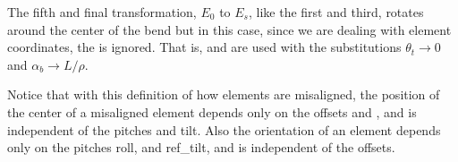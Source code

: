The fifth and final transformation, $E_0$ to $E_s$, like the first and third, rotates around the
center of the bend but in this case, since we are dealing with element coordinates, the
 is ignored.  That is,  and  are used with the substitutions
$\theta_t \rightarrow 0$ and $\alpha_b \rightarrow L/\rho$.

Notice that with this definition of how elements are misaligned, the position of the center of a
misaligned element depends only on the offsets and , and is independent of the pitches and
tilt. Also the orientation of an element depends only on the pitches roll, and ref_tilt, and is
independent of the offsets.

